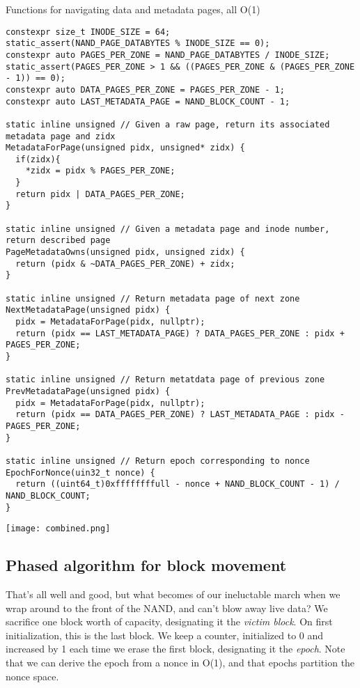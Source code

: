 \documentclass[letterpaper,10pt]{article}
\begin{document}
\begin{listing}[ht]
\caption{Functions for navigating data and metadata pages, all O(1)}
\begin{verbatim}
constexpr size_t INODE_SIZE = 64;
static_assert(NAND_PAGE_DATABYTES % INODE_SIZE == 0);
constexpr auto PAGES_PER_ZONE = NAND_PAGE_DATABYTES / INODE_SIZE;
static_assert(PAGES_PER_ZONE > 1 && ((PAGES_PER_ZONE & (PAGES_PER_ZONE - 1)) == 0);
constexpr auto DATA_PAGES_PER_ZONE = PAGES_PER_ZONE - 1;
constexpr auto LAST_METADATA_PAGE = NAND_BLOCK_COUNT - 1;

static inline unsigned // Given a raw page, return its associated metadata page and zidx
MetadataForPage(unsigned pidx, unsigned* zidx) {
  if(zidx){
    *zidx = pidx % PAGES_PER_ZONE;
  }
  return pidx | DATA_PAGES_PER_ZONE;
}

static inline unsigned // Given a metadata page and inode number, return described page
PageMetadataOwns(unsigned pidx, unsigned zidx) {
  return (pidx & ~DATA_PAGES_PER_ZONE) + zidx;
}

static inline unsigned // Return metadata page of next zone
NextMetadataPage(unsigned pidx) {
  pidx = MetadataForPage(pidx, nullptr);
  return (pidx == LAST_METADATA_PAGE) ? DATA_PAGES_PER_ZONE : pidx + PAGES_PER_ZONE;
}

static inline unsigned // Return metatdata page of previous zone
PrevMetadataPage(unsigned pidx) {
  pidx = MetadataForPage(pidx, nullptr);
  return (pidx == DATA_PAGES_PER_ZONE) ? LAST_METADATA_PAGE : pidx - PAGES_PER_ZONE;
}

static inline unsigned // Return epoch corresponding to nonce
EpochForNonce(uin32_t nonce) {
  return ((uint64_t)0xffffffffull - nonce + NAND_BLOCK_COUNT - 1) / NAND_BLOCK_COUNT;
}
\end{verbatim}
\end{listing}

\begin{center}
\texttt{[image: combined.png]}
\end{center}

\subsection{Phased algorithm for block movement} \label{shuffle}
That's all well and good, but what becomes of our ineluctable march when we
wrap around to the front of the NAND, and can't blow away live data? We
sacrifice one block worth of capacity, designating it the \textit{victim
  block}. On first initialization, this is the last block. We keep a counter,
initialized to 0 and increased by 1 each time we erase the first block,
designating it the \textit{epoch}. Note that we can derive the epoch from a
nonce in O(1), and that epochs partition the nonce space.
\end{document}
